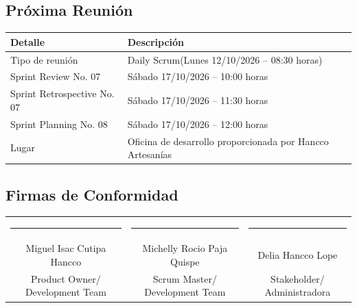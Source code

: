 \documentclass[12pt,a4paper]{article}
\renewcommand{\arraystretch}{1.25}
\begin{document}
\subsection*{Próxima Reunión}

\begin{center}
\small
\begin{tabularx}{\textwidth}{p{4.5cm} L}
\toprule
\textbf{Detalle} & \textbf{Descripción} \\
\midrule
Tipo de reunión & Daily Scrum(Lunes 12/10/2026 -- 08:30 horas) \\
Sprint Review No. 07 & Sábado 17/10/2026 -- 10:00 horas \\
Sprint Retrospective No. 07 & Sábado 17/10/2026 -- 11:30 horas \\
Sprint Planning No. 08 & Sábado 17/10/2026 -- 12:00 horas \\
Lugar & Oficina de desarrollo proporcionada por Hancco Artesanías \\
\bottomrule
\end{tabularx}
\end{center}

\subsection*{Firmas de Conformidad}

\begin{center}
\renewcommand{\arraystretch}{2}
\begin{tabular}{ccc}
\rule{4.5cm}{0.4pt} & \rule{4.5cm}{0.4pt} & \rule{4.5cm}{0.4pt} \\
Miguel Isac Cutipa Hancco & Michelly Rocio Paja Quispe & Delia Hancco Lope \\
Product Owner/ Development Team & Scrum Master/ Development Team & Stakeholder/ Administradora
\end{tabular}
\end{center}
\end{document}

